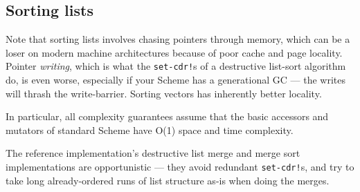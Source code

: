\subsection{Sorting lists}\label{Sortinglists}

Note that sorting lists involves chasing pointers through memory, which
can be a loser on modern machine architectures because of poor cache and
page locality. Pointer \emph{writing}, which is what the
\texttt{set-cdr!}s of a destructive list-sort algorithm do, is even
worse, especially if your Scheme has a generational GC --- the writes
will thrash the write-barrier. Sorting vectors has inherently better
locality.

In particular, all complexity guarantees assume that the basic accessors
and mutators of standard Scheme have O(1) space and time complexity.

The reference implementation's destructive list merge and merge sort
implementations are opportunistic --- they avoid redundant
\texttt{set-cdr!}s, and try to take long already-ordered runs of list
structure as-is when doing the merges.

